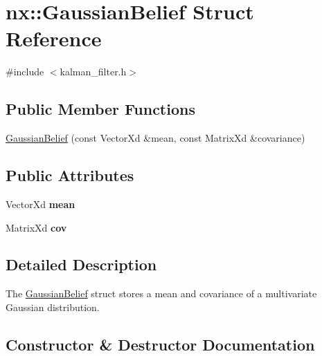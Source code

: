 \hypertarget{structnx_1_1GaussianBelief}{}\section{nx\+:\+:Gaussian\+Belief Struct Reference}
\label{structnx_1_1GaussianBelief}


{\ttfamily \#include $<$kalman\+\_\+filter.\+h$>$}

\subsection*{Public Member Functions}
\begin{DoxyCompactItemize}
\item 
\hyperlink{structnx_1_1GaussianBelief_ab604fe9315b215ce1a6af633278d78ef}{Gaussian\+Belief} (const Vector\+Xd \&mean, const Matrix\+Xd \&covariance)
\end{DoxyCompactItemize}
\subsection*{Public Attributes}
\begin{DoxyCompactItemize}
\item 
\mbox{\label{structnx_1_1GaussianBelief_a57b6672ced4ad92eca9f0dfb32391f67}} 
Vector\+Xd {\bfseries mean}
\item 
\mbox{\label{structnx_1_1GaussianBelief_a4046d2db5369392801195631549fc658}} 
Matrix\+Xd {\bfseries cov}
\end{DoxyCompactItemize}


\subsection{Detailed Description}
The \hyperlink{structnx_1_1GaussianBelief}{Gaussian\+Belief} struct stores a mean and covariance of a multivariate Gaussian distribution. 

\subsection{Constructor \& Destructor Documentation}
\mbox{\label{structnx_1_1GaussianBelief_ab604fe9315b215ce1a6af633278d78ef}} 

